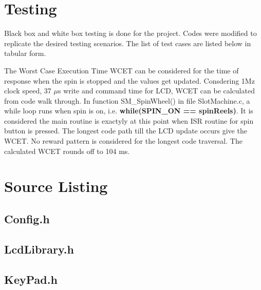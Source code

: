 \documentclass[a4paper,13pt,openany,sffamily]{memoir}
\begin{document}
\chapter {Testing}
Black box and white box testing is done for the project. Codes were modified to replicate the desired testing scenarios. The list of test cases are listed below in tabular form.



The Worst Case Execution Time WCET can be considered for the time of response when the spin is stopped and the values get updated. Consdering 1Mz clock speed, 37 \(\mu\)s write and command time for LCD, WCET can be calculated from code walk through. In function SM\_SpinWheel() in file SlotMachine.c, a while loop runs when spin is on, i.e. \textbf{while(SPIN\_ON == spinReels)}. It is considered the main routine is exactyly at this point when ISR routine for spin button is pressed. The longest code path till the LCD update occurs give the WCET. No reward pattern is considered for the longest code traversal. The calculated WCET rounds off to 104 ms.


\chapter {Source Listing}



\section{Config.h}
\begin{small}

\end{small}

\section{LcdLibrary.h}
\begin{small}

\end{small}

\section{KeyPad.h}
\begin{small}

\end{small}
\end{document}
